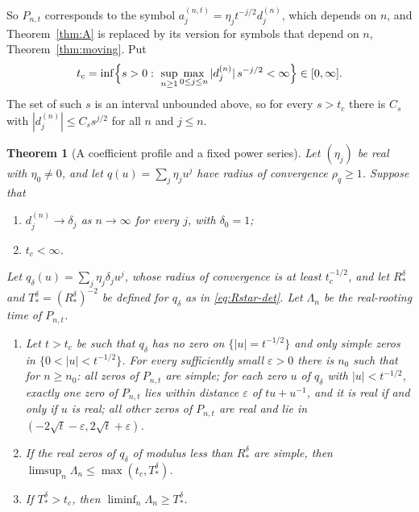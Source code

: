 \documentclass[11pt]{amsart}
\newtheorem{theorem}{Theorem}[section]
\theoremstyle{definition}
\theoremstyle{remark}
\numberwithin{equation}{section}
\newcommand{\eps}{\varepsilon}
\begin{document}
So $P_{n,t}$ corresponds to the symbol $a^{(n,t)}_j=\eta_jt^{-j/2}d^{(n)}_j$, which depends on $n$, and Theorem~\ref{thm:A} is replaced by its version for symbols that depend on $n$, Theorem~\ref{thm:moving}. Put
\begin{equation}\label{eq:tc}
t_c=\inf\Bigl\{s>0:\ \sup_{n\ge1}\max_{0\le j\le n}|d^{(n)}_j|\,s^{-j/2}<\infty\Bigr\}\in[0,\infty].
\end{equation}
The set of such $s$ is an interval unbounded above, so for every $s>t_c$ there is $C_s$ with $|d^{(n)}_j|\le C_ss^{j/2}$ for all $n$ and $j\le n$.

\begin{theorem}[A coefficient profile and a fixed power series]\label{thm:profile}
Let $(\eta_j)$ be real with $\eta_0\ne0$, and let $q(u)=\sum_j\eta_ju^j$ have radius of convergence $\rho_q\ge1$. Suppose that
\begin{enumerate}
\item[(P1)] $d^{(n)}_j\to\delta_j$ as $n\to\infty$ for every $j$, with $\delta_0=1$;
\item[(P2)] $t_c<\infty$.
\end{enumerate}
Let $q_\delta(u)=\sum_j\eta_j\delta_ju^j$, whose radius of convergence is at least $t_c^{-1/2}$, and let $R_*^\delta$ and $T_*^\delta=(R_*^\delta)^{-2}$ be defined for $q_\delta$ as in \eqref{eq:Rstar-det}. Let $\Lambda_n$ be the real-rooting time of $P_{n,t}$.
\begin{enumerate}
\item[(a)] Let $t>t_c$ be such that $q_\delta$ has no zero on $\{|u|=t^{-1/2}\}$ and only simple zeros in $\{0<|u|<t^{-1/2}\}$. For every sufficiently small $\eps>0$ there is $n_0$ such that for $n\ge n_0$: all zeros of $P_{n,t}$ are simple; for each zero $u$ of $q_\delta$ with $|u|<t^{-1/2}$, exactly one zero of $P_{n,t}$ lies within distance $\eps$ of $tu+u^{-1}$, and it is real if and only if $u$ is real; all other zeros of $P_{n,t}$ are real and lie in $(-2\sqrt t-\eps,2\sqrt t+\eps)$.
\item[(b)] If the real zeros of $q_\delta$ of modulus less than $R_*^\delta$ are simple, then $\limsup_n\Lambda_n\le\max(t_c,T^\delta_*)$.
\item[(c)] If $T^\delta_*>t_c$, then $\liminf_n\Lambda_n\ge T^\delta_*$.
\end{enumerate}
\end{theorem}
\end{document}
